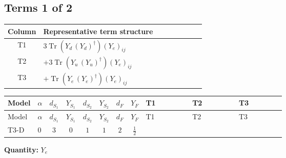 \documentclass[8pt]{article}
\begin{document}
\begin{landscape}
\subsection*{Terms 1 of 2}
\begin{center}
\begin{tabular}{@{}c >{\raggedright\arraybackslash}p{0.82\linewidth}@{}}
\toprule
Column & Representative term structure \\
\midrule
T1 & \(\displaystyle 3 \operatorname{Tr}\!\left({Y_d}\,\left({Y_d}\right)^{\dagger}\right) \left({Y_e}\right)_{ij}\) \\
\midrule
T2 & \(\displaystyle +3 \operatorname{Tr}\!\left({Y_u}\,\left({Y_u}\right)^{\dagger}\right) \left({Y_e}\right)_{ij}\) \\
\midrule
T3 & \(\displaystyle +\operatorname{Tr}\!\left({Y_e}\,\left({Y_e}\right)^{\dagger}\right) \left({Y_e}\right)_{ij}\) \\
\midrule
\bottomrule
\end{tabular}
\end{center}
\smallskip
\tiny
\begin{longtable}{@{}llcccccc >{\raggedright\arraybackslash}p{0.21\linewidth} >{\raggedright\arraybackslash}p{0.21\linewidth} >{\raggedright\arraybackslash}p{0.21\linewidth}@{}}
\toprule
Model & $\alpha$ & $d_{S_1}$ & $Y_{S_1}$ & $d_{S_2}$ & $Y_{S_2}$ & $d_F$ & $Y_F$ & T1 & T2 & T3 \\
\midrule
\endfirsthead
\toprule
Model & $\alpha$ & $d_{S_1}$ & $Y_{S_1}$ & $d_{S_2}$ & $Y_{S_2}$ & $d_F$ & $Y_F$ & T1 & T2 & T3 \\
\midrule
\endhead
T3-D & $0$ & $3$ & $0$ & $1$ & $1$ & $2$ & $\frac{1}{2}$ & \scriptsize\adjustbox{max width=\linewidth}{$\begin{gathered} 3 \operatorname{Tr}\!\left({Y_d}\,\left({Y_d}\right)^{\dagger}\right) \left({Y_e}\right)_{ij}\end{gathered}$} & \scriptsize\adjustbox{max width=\linewidth}{$\begin{gathered} +3 \operatorname{Tr}\!\left({Y_u}\,\left({Y_u}\right)^{\dagger}\right) \left({Y_e}\right)_{ij}\end{gathered}$} & \scriptsize\adjustbox{max width=\linewidth}{$\begin{gathered} +\operatorname{Tr}\!\left({Y_e}\,\left({Y_e}\right)^{\dagger}\right) \left({Y_e}\right)_{ij}\end{gathered}$} \\
\midrule
\bottomrule
\end{longtable}
\clearpage
\noindent\textbf{Quantity: }$Y_e$\par\smallskip

\end{landscape}
\end{document}
